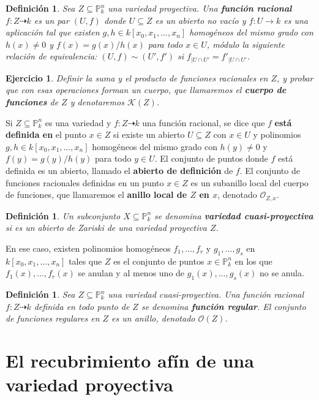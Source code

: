 \documentclass[a4paper,10pt]{book}
\newtheorem{defn}[thm]{Definición}
\newtheorem{ejercicio}{Ejercicio}[chapter]
\newcommand{\PP}{\mathbb P}
\newcommand{\Pnk}{\PP^n_k}
\newcommand{\OO}{{\mathcal O}}
\begin{document}
\begin{defn}
 Sea $Z\subseteq\Pnk$ una variedad proyectiva. Una {\bf función racional} $f:Z\dashrightarrow k$ es un par $(U,f)$ donde $U\subseteq Z$ es un abierto no vacío y $f:U\to k$ es una aplicación tal que existen $g,h\in k[x_0,x_1,\ldots,x_n]$ homogéneos del mismo grado con $h(x)\neq 0$ y $f(x)=g(x)/h(x)$ para todo $x\in U$, módulo la siguiente relación de equivalencia: $(U,f)\sim (U',f')$ si $f_{|U\cap U'}=f'_{|U\cap U'}$.
\end{defn}

\begin{ejercicio}
 Definir la suma y el producto de funciones racionales en $Z$, y probar que con esas operaciones forman un cuerpo, que llamaremos el {\bf cuerpo de funciones} de $Z$ y denotaremos ${\mathcal K}(Z)$.
\end{ejercicio}

Si $Z\subseteq\Pnk$ es una variedad y $f:Z\dashrightarrow k$ una función racional, se dice que $f$ {\bf está definida en} el punto $x\in Z$ si existe un abierto $U\subseteq Z$ con $x\in U$ y polinomios $g,h\in k[x_0,x_1,\ldots,x_n]$ homogéneos del mismo grado con $h(y)\neq 0$ y $f(y)=g(y)/h(y)$ para todo $y\in U$. El conjunto de puntos donde $f$ está definida es un abierto, llamado el {\bf abierto de definición} de $f$. El conjunto de funciones racionales definidas en un punto $x\in Z$ es un subanillo local del cuerpo de funciones, que llamaremos el {\bf anillo local de $Z$ en $x$}, denotado $\OO_{Z,x}$.

\begin{defn}
 Un subconjunto $X\subseteq\Pnk$ se denomina {\bf variedad cuasi-proyectiva} si es un abierto de Zariski de una variedad proyectiva $Z$.
\end{defn}

En ese caso, existen polinomios homogéneos $f_1,\ldots,f_r$ y $g_1,\ldots,g_s$ en $k[x_0,x_1,\ldots,x_n]$ tales que $Z$ es el conjunto de puntos $x\in\Pnk$ en los que $f_1(x),\ldots,f_r(x)$ se anulan y al menos uno de $g_1(x),\ldots,g_s(x)$ no se anula. 

\begin{defn}
 Sea $Z\subseteq\Pnk$ una variedad cuasi-proyectiva. Una función racional $f:Z\dashrightarrow k$ definida en todo punto de $Z$ se denomina {\bf función regular}. El conjunto de funciones regulares en $Z$ es un anillo, denotado $\OO(Z)$.
\end{defn}

\section{El recubrimiento afín de una variedad proyectiva}\label{recubrimientoafin}
\end{document}

